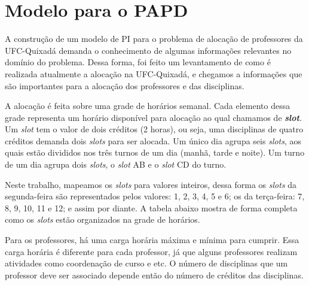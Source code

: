 \chapter{Modelo para o PAPD}
\label{cap:modelo-para-o-papd}

A construção de um modelo de PI para o problema de alocação de professores da UFC-Quixadá demanda o conhecimento de algumas informações relevantes no domínio do problema. Dessa forma, foi feito um levantamento de como é realizada atualmente a alocação na UFC-Quixadá, e chegamos a informações que são importantes para a alocação dos professores e das disciplinas. 

A alocação é feita sobre uma grade de horários semanal. Cada elemento dessa grade representa um horário disponível para alocação ao qual chamamos de \textbf{\textit{slot}}. Um \textit{slot} tem o valor de dois créditos (2 horas), ou seja, uma disciplinas de quatro créditos demanda dois \textit{slots} para ser alocada. Um único dia agrupa seis \textit{slots}, aos quais estão divididos nos três turnos de um dia (manhã, tarde e noite). Um turno de um dia agrupa dois \textit{slots}, o \textit{slot} AB e o \textit{slot} CD do turno. 

Neste trabalho, mapeamos os \textit{slots} para valores inteiros, dessa forma os \textit{slots} da segunda-feira são representados pelos valores: 1, 2, 3, 4, 5 e 6; os da terça-feira: 7, 8, 9, 10, 11 e 12; e assim por diante. A tabela abaixo mostra de forma completa como os \textit{slots} estão organizados na grade de horários.

\begin{figure}[htbp]
	\centering
\end{figure}


Para os professores, há uma carga horária máxima e mínima para cumprir. Essa carga horária é diferente para cada professor, já que alguns professores realizam atividades como coordenação de curso e etc. O número de disciplinas que um professor deve ser associado depende então do número de créditos das disciplinas. 


